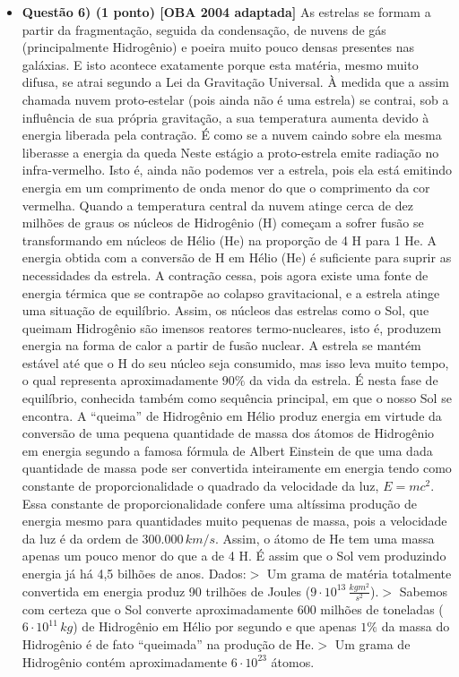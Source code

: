 \documentclass[a4paper, 12pt]{article}
\begin{document}
\begin{flushleft}
\begin{itemize}
            \item \textbf{Questão 6) (1 ponto) [OBA 2004 adaptada]} As estrelas se formam a partir da fragmentação, seguida da condensação, de nuvens de gás (principalmente Hidrogênio) e poeira muito pouco densas presentes nas galáxias. E isto acontece exatamente porque esta matéria, mesmo muito difusa, se atrai segundo a Lei da Gravitação Universal. À medida que a assim chamada nuvem proto-estelar (pois ainda não é uma estrela) se contrai, sob a influência de sua própria gravitação, a sua temperatura aumenta devido à energia liberada pela contração. É como se a nuvem caindo sobre ela mesma liberasse a energia da queda Neste estágio a proto-estrela emite radiação no infra-vermelho. Isto é, ainda não podemos ver a estrela, pois ela está emitindo energia em um comprimento de onda menor do que o comprimento da cor vermelha. Quando a temperatura central da nuvem atinge cerca de dez milhões de graus os núcleos de Hidrogênio (H) começam a sofrer fusão se transformando em núcleos de Hélio (He) na proporção de 4 H para 1 He. A energia obtida com a conversão de H em Hélio (He) é suficiente para suprir as necessidades da estrela. A contração cessa, pois agora existe uma fonte de energia térmica que se contrapõe ao colapso gravitacional, e a estrela atinge uma situação de equilíbrio. Assim, os núcleos das estrelas como o Sol, que queimam Hidrogênio são imensos reatores termo-nucleares, isto é, produzem energia na forma de calor a partir de fusão nuclear. A estrela se mantém estável até que o H do seu núcleo seja consumido, mas isso leva muito tempo, o qual representa aproximadamente $90\%$ da vida da estrela. É nesta fase de equilíbrio, conhecida também como sequência principal, em que o nosso Sol se encontra. A “queima” de Hidrogênio em Hélio produz energia em virtude da conversão de uma pequena quantidade de massa dos átomos de Hidrogênio em energia segundo a famosa fórmula de Albert Einstein de que uma dada quantidade de massa pode ser convertida inteiramente em energia tendo como constante de proporcionalidade o quadrado da velocidade da luz, $E = mc^2$. Essa constante de proporcionalidade confere uma altíssima produção de energia mesmo para quantidades muito pequenas de massa, pois a velocidade da luz é da ordem de $300.000 \, km/s$. Assim, o átomo de He tem uma massa apenas um pouco menor do que a de 4 H. É assim que o Sol vem produzindo energia já há 4,5 bilhões de anos. \linebreak \linebreak Dados:\linebreak$>$ Um grama de matéria totalmente convertida em energia produz 90 trilhões de Joules ($9 \cdot 10^{13} \, \frac{kgm^2}{s^2}$).\linebreak$>$ Sabemos com certeza que o Sol converte aproximadamente 600 milhões de toneladas ($6 \cdot 10^{11} \, kg$) de Hidrogênio em Hélio por segundo e que apenas $1\%$ da massa do Hidrogênio é de fato “queimada” na produção de He.\linebreak$>$ Um grama de Hidrogênio contém aproximadamente $6 \cdot 10^{23}$ átomos.

\end{itemize}
\end{flushleft}
\end{document}
